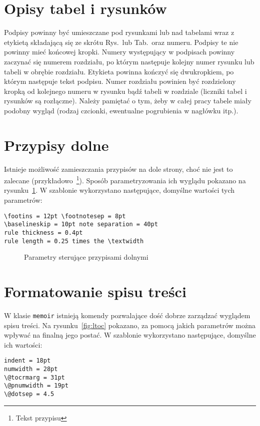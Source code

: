 \section{Opisy tabel i rysunków}
Podpisy powinny być umieszczane pod rysunkami lub nad tabelami wraz z etykietą składającą się ze skrótu Rys.\ lub Tab.\ oraz numeru. Podpisy te nie powinny mieć końcowej kropki. Numery występujący w podpisach powinny zaczynać się numerem rozdziału, po którym następuje kolejny numer rysunku lub tabeli w obrębie rozdziału. Etykieta powinna kończyć się dwukropkiem, po którym następuje tekst podpisu. Numer rozdziału powinien być rozdzielony kropką od kolejnego numeru w rysunku bądź tabeli w rozdziale (liczniki tabel i rysunków są rozłączne). Należy pamiętać o tym, żeby w całej pracy tabele miały podobny wygląd (rodzaj czcionki, ewentualne pogrubienia w nagłówku itp.). %

\section{Przypisy dolne}
Istnieje możliwość zamieszczania przypisów na dole strony, choć nie jest to zalecane (przykładowo~\footnote{Tekst przypisu}). Sposób parametryzowania ich wyglądu pokazano na rysunku~\ref{fig:fp}. W szablonie wykorzystano następujące, domyślne wartości tych parametrów:
\begin{lstlisting}[basicstyle=\footnotesize\ttfamily]
\footins = 12pt \footnotesep = 8pt
\baselineskip = 10pt note separation = 40pt
rule thickness = 0.4pt
rule length = 0.25 times the \textwidth
\end{lstlisting}
\begin{figure}[htb]
\drawfootnote
\caption{Parametry sterujące przypisami dolnymi} \label{fig:fp}
\end{figure}


\section{Formatowanie spisu treści}
W klasie \texttt{memoir} istnieją komendy pozwalające dość dobrze zarządzać wyglądem spisu treści. Na rysunku~\ref{fig:ltoc} pokazano, za pomocą jakich parametrów można wpływać na finalną jego postać. W szablonie wykorzystano następujące, domyślne ich wartości:
\begin{lstlisting}[basicstyle=\footnotesize\ttfamily]
indent = 18pt 
numwidth = 28pt
\@tocrmarg = 31pt 
\@pnumwidth = 19pt
\@dotsep = 4.5
\end{lstlisting}

